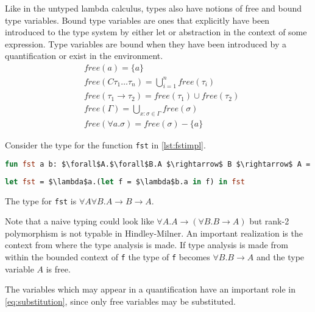 \documentclass[11pt,oneside,a4paper]{report}
\begin{document}
Like in the untyped lambda calculus, types also have notions of free and bound type variables.
Bound type variables are ones that explicitly have been introduced to the type system by either let or abstraction in the context of some expression.
Type variables are bound when they have been introduced by a quantification or exist in the environment.
\begin{align}
	 & \textit{free}(a) = \{ a \}                                                              \\
	 & \textit{free}(C \tau_1 \dots \tau_n ) = \bigcup_{i = 1}^n \textit{free}(\tau_i)           \\
     & \textit{free}(\tau_1 \rightarrow \tau_2) = \textit{free}(\tau_1) \cup \textit{free}(\tau_2)          \\
	 & \textit{free}(\Gamma) = \bigcup_{x:\sigma \in \Gamma} \textit{free}(\sigma)             \\
	 & \textit{free}(\forall a . \sigma) = \textit{free}(\sigma) - \{ a \}                     
\end{align}
\begin{exmp}
Consider the type for the function \texttt{fst} in \autoref{lst:fstimpl}.
\begin{lstlisting}[language=ML,caption={First function},label={lst:fstimplbad},mathescape=true]
fun fst a b: $\forall$A.$\forall$B.A $\rightarrow$ B $\rightarrow$ A = a;
\end{lstlisting}
\begin{lstlisting}[language=ML,caption={First function in lambda calculus},label={lst:fstimpl},mathescape=true]
let fst = $\lambda$a.(let f = $\lambda$b.a in f) in fst
\end{lstlisting}
    The type for \texttt{fst} is $\forall A \forall B . A \rightarrow B \rightarrow A$.

    Note that a naive typing could look like $\forall A  . A \rightarrow (\forall B . B \rightarrow A)$ but rank-2 polymorphism is not typable in Hindley-Milner.
    An important realization is the context from where the type analysis is made.
    If type analysis is made from within the bounded context of \texttt{f} the type of \texttt{f} becomes $\forall B . B \rightarrow A$ and the type variable $A$ is free.
\end{exmp}
The variables which may appear in a quantification have an important role in \autoref{eq:substitution}, since only free variables may be substituted.
\end{document}
